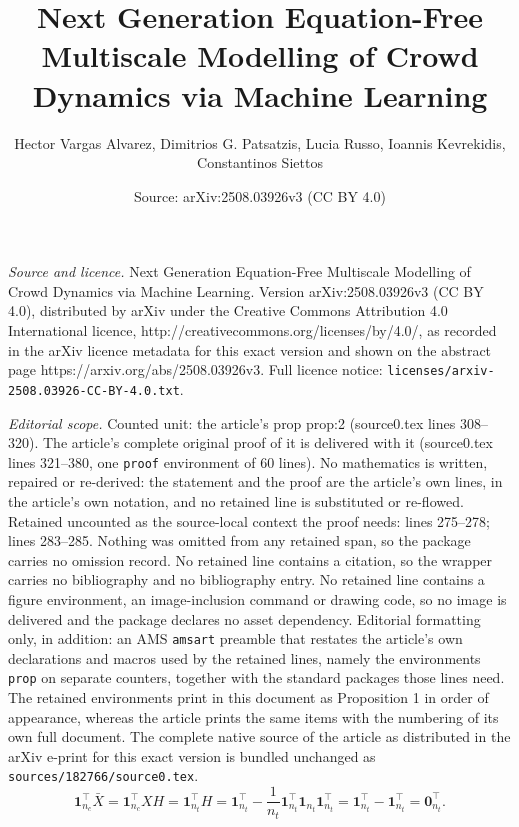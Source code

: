 \documentclass[10pt,a4paper]{amsart}
\title{Next Generation Equation-Free Multiscale Modelling of Crowd Dynamics via Machine Learning}
\author{Hector Vargas Alvarez, Dimitrios G. Patsatzis, Lucia Russo, Ioannis Kevrekidis, Constantinos Siettos}
\date{Source: arXiv:2508.03926v3 (CC BY 4.0)}
\begin{document}
\maketitle

\noindent\emph{Source and licence.} Next Generation Equation-Free Multiscale Modelling of Crowd Dynamics via Machine Learning. Version arXiv:2508.03926v3 (CC BY 4.0), distributed by arXiv under the Creative Commons Attribution 4.0 International licence, http://creativecommons.org/licenses/by/4.0/, as recorded in the arXiv licence metadata for this exact version and shown on the abstract page https://arxiv.org/abs/2508.03926v3. Full licence notice: \texttt{licenses/arxiv-2508.03926-CC-BY-4.0.txt}.\par\smallskip

\noindent\textit{Editorial scope.} Counted unit: the article's prop prop:2 (source0.tex lines 308--320). The article's complete original proof of it is delivered with it (source0.tex lines 321--380, one \texttt{proof} environment of 60 lines). No mathematics is written, repaired or re-derived: the statement and the proof are the article's own lines, in the article's own notation, and no retained line is substituted or re-flowed.  Retained uncounted as the source-local context the proof needs: lines 275--278; lines 283--285.  Nothing was omitted from any retained span, so the package carries no omission record.  No retained line contains a citation, so the wrapper carries no bibliography and no bibliography entry.  No retained line contains a figure environment, an image-inclusion command or drawing code, so no image is delivered and the package declares no asset dependency.  Editorial formatting only, in addition: an AMS \texttt{amsart} preamble that restates the article's own declarations and macros used by the retained lines, namely the environments \texttt{prop} on separate counters, together with the standard packages those lines need.  The retained environments print in this document as Proposition 1 in order of appearance, whereas the article prints the same items with the numbering of its own full document.  The complete native source of the article as distributed in the arXiv e-print for this exact version is bundled unchanged as \texttt{sources/182766/source0.tex}.
\begin{equation}
   \mathbf{1}_{n_c}^\top \bar{X}= \mathbf{1}_{n_c}^\top XH=\mathbf{1}_{n_t}^\top H=\mathbf{1}_{n_t}^\top-\frac{1}{n_t}\mathbf{1}_{n_t}^\top\mathbf{1}_{n_t}\mathbf{1}_{n_t}^\top=\mathbf{1}_{n_t}^\top-\mathbf{1}_{n_t}^\top=\boldsymbol{0}^\top_{n_t}.
   \label{eq:orthog1}
\end{equation}
\end{document}
